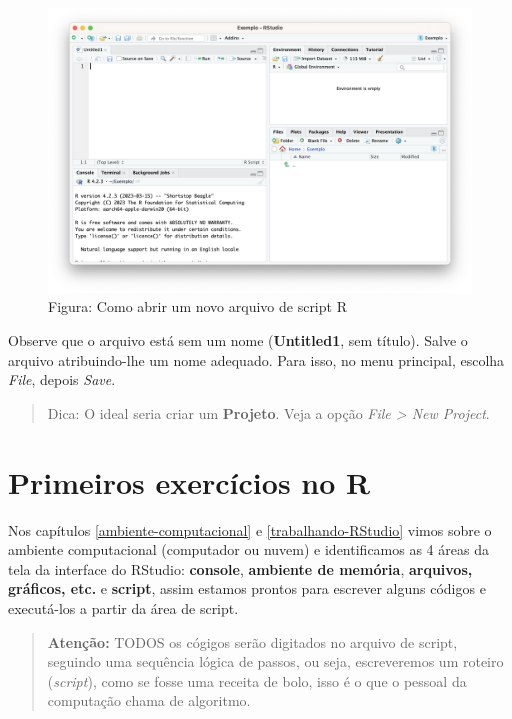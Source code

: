 \documentclass[
]{book}
\begin{document}
\begin{figure}
\centering
\includegraphics{telaScript.png}
\caption{Figura: Como abrir um novo arquivo de script R}
\end{figure}

Observe que o arquivo está sem um nome (\textbf{Untitled1}, sem título). Salve o arquivo atribuindo-lhe um nome adequado. Para isso, no menu principal, escolha \emph{File}, depois \emph{Save}.

\begin{quote}
Dica: O ideal seria criar um \textbf{Projeto}. Veja a opção \emph{File \textgreater{} New Project}.
\end{quote}

\chapter{Primeiros exercícios no R}\label{primeiros-exercuxedcios-no-r}

Nos capítulos \ref{ambiente-computacional} e \ref{trabalhando-RStudio} vimos sobre o ambiente computacional (computador ou nuvem) e identificamos as 4 áreas da tela da interface do RStudio: \textbf{console}, \textbf{ambiente de memória}, \textbf{arquivos, gráficos, etc.} e \textbf{script}, assim estamos prontos para escrever alguns códigos e executá-los a partir da área de script.

\begin{quote}
\textbf{Atenção:} TODOS os cógigos serão digitados no arquivo de script, seguindo uma sequência lógica de passos, ou seja, escreveremos um roteiro (\emph{script}), como se fosse uma receita de bolo, isso é o que o pessoal da computação chama de algoritmo.
\end{quote}
\end{document}
